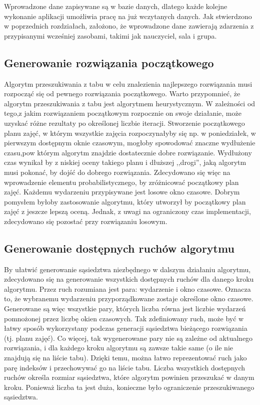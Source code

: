 Wprowadzone dane zapisywane są w bazie danych, dlatego każde kolejne wykonanie aplikacji umożliwia pracę na już wczytanych danych. Jak stwierdzono w poprzednich rozdziałach, założono, że wprowadzone dane zawierają zdarzenia z przypisanymi wcześniej zasobami, takimi jak nauczyciel, sala i grupa.

\subsection{Generowanie rozwiązania początkowego}

Algorytm przeszukiwania z tabu w celu znalezienia najlepszego rozwiązania musi rozpocząć się od pewnego rozwiązania początkowego. Warto przypomnieć, że algorytm przeszukiwania z tabu jest algorytmem heurystycznym. W zależności od tego,z jakim rozwiązaniem początkowym rozpocznie on swoje działanie, może uzyskać różne rezultaty po określonej liczbie iteracji. Stworzenie początkowego planu zajęć, w którym wszystkie zajęcia rozpoczynałyby się np. w poniedziałek, w pierwszym dostępnym oknie czasowym, mogłoby spowodować znaczne wydłużenie czasu,pow którym algorytm znajdzie dostatecznie dobre rozwiązanie. Wydłużony czas wynikał by z niskiej oceny takiego planu i dłuższej ,,drogi'', jaką algorytm musi pokonać, by dojść do dobrego rozwiązania. Zdecydowano się więc na wprowadzenie elementu probabilistycznego, by zróżnicować początkowy plan zajęć. Każdemu wydarzeniu przypisywane jest losowe okno czasowe. Dobrym pomysłem byłoby zastosowanie algorytmu, który utworzył by początkowy plan zajęć z jeszcze lepszą oceną. Jednak, z uwagi na ograniczony czas implementacji, zdecydowano się pozostać przy rozwiązaniu losowym.

\subsection{Generowanie dostępnych ruchów algorytmu}

By ułatwić generowanie sąsiedztwa niezbędnego w dalszym działaniu algorytmu, zdecydowano się na generowanie wszystkich dostępnych ruchów dla danego kroku algorytmu. Przez ruch rozumiana jest para: wydarzenie i okno czasowe. Oznacza to, że wybranemu wydarzeniu przyporządkowane zostaje określone okno czasowe. Generowane są więc wszystkie pary, których liczba równa jest liczbie wydarzeń pomnożonej przez liczbę okien czasowych. Tak zdefiniowany ruch, może być w łatwy sposób wykorzystany podczas generacji sąsiedztwa bieżącego rozwiązania (tj. planu zajęć). Co więcej, tak wygenerowane pary nie są zależne od aktualnego rozwiązania, i dla każdego kroku algorytmu są zawsze takie same (o ile nie znajdują się na liście tabu). Dzięki temu, można łatwo reprezentować ruch jako parę indeksów i przechowywać go na liście tabu. Liczba wszystkich dostępnych ruchów określa rozmiar sąsiedztwa, które algorytm powinien przeszukać w danym kroku. Ponieważ liczba ta jest duża, konieczne było ograniczenie przeszukiwanego sąsiedztwa.

